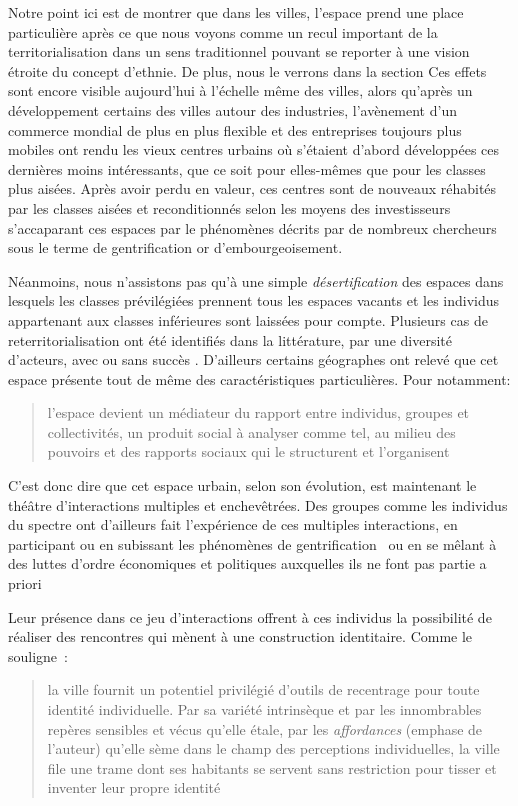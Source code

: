 Notre point ici est de montrer que dans les villes, l'espace prend une place particulière après ce que nous voyons comme un recul important de la territorialisation dans un sens traditionnel pouvant se reporter à une vision étroite du concept d'ethnie. 
De plus, nous le verrons dans la section  Ces effets sont encore visible aujourd'hui à l'échelle même des villes, alors qu'après un développement certains des villes autour des industries, l'avènement d'un commerce mondial de plus en plus flexible et des entreprises toujours plus mobiles ont rendu les vieux centres urbains où s'étaient d'abord développées ces dernières moins intéressants, que ce soit pour elles-mêmes que pour les classes plus aisées. 
Après avoir perdu en valeur, ces centres sont de nouveaux réhabités par les classes aisées et reconditionnés selon les moyens des investisseurs s'accaparant ces espaces par le phénomènes décrits par de nombreux chercheurs sous le terme de gentrification or d'embourgeoisement.

Néanmoins, nous n'assistons pas qu'à une simple \emph{désertification} des espaces dans lesquels les classes prévilégiées prennent tous les espaces vacants et les individus appartenant aux classes inférieures sont laissées pour compte.
Plusieurs cas de reterritorialisation ont été identifiés dans la littérature, par une diversité d'acteurs, avec ou sans succès \citet{Hatvany2005}. 
D'ailleurs certains géographes ont relevé que cet espace présente tout de même des caractéristiques particulières. 
Pour \citeauthor{Courville1991} notamment:
\blockquote[{\cite[41]{Courville1991}}][.]{l'espace devient un médiateur du
  rapport entre individus, groupes et collectivités, un produit social à
  analyser comme tel, au milieu des pouvoirs et des rapports sociaux qui le
  structurent et l'organisent}.

C'est donc dire que cet espace urbain, selon son évolution, est maintenant le théâtre d'interactions multiples et enchevêtrées. 
Des groupes comme les individus du spectre \lgbt{} ont d'ailleurs fait l'expérience de ces multiples interactions, en participant ou en subissant les phénomènes de gentrification~\autocite{Podmore2001,Giraud2014,Hogan2005} ou en se mêlant à des luttes d'ordre économiques et politiques auxquelles ils ne font pas partie a priori~\autocite{Kelliher2014} 

Leur présence dans ce jeu d'interactions offrent à ces individus la possibilité de réaliser des rencontres qui mènent à une construction identitaire. 
Comme le souligne~\citeauthor{DiMeo2007}: \blockquote[{\cite[81]{DiMeo2007}}][.]{\textelp{}
  la ville fournit un potentiel privilégié d’outils de recentrage pour toute
  identité individuelle. Par sa variété intrinsèque et par les innombrables
  repères sensibles et vécus qu’elle étale, par les \emph{affordances} (emphase
  de l'auteur) qu’elle sème dans le champ des perceptions individuelles, la
  ville file une trame dont ses habitants se servent sans restriction pour
  tisser et inventer leur propre identité}.

